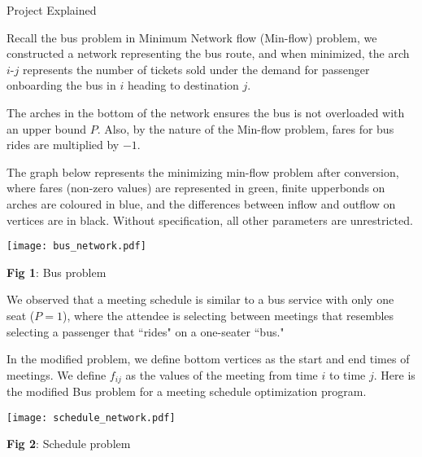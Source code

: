 \documentclass{article}
\begin{document}
\begin{center}
{\huge Project Explained
}
\end{center}
Recall the bus problem in Minimum Network flow (Min-flow) problem, we constructed a network representing the bus route, and when minimized, the arch $i$-$j$ represents the number of tickets sold under the demand for passenger onboarding the bus in $i$ heading to destination $j$.

The arches in the bottom of the network ensures the bus is not overloaded with an upper bound $P$. Also, by the nature of the Min-flow problem, fares for bus rides are multiplied by $-1$.

The graph below represents the minimizing min-flow problem after conversion, where fares (non-zero values) are represented in {\color{ForestGreen} green}, finite upperbonds on arches are coloured in  {\color{blue} blue}, and the differences between inflow and outflow on vertices are in black. Without specification, all other parameters are unrestricted.

\begin{center}
\texttt{[image: bus\_network.pdf]}

{\small \textbf{Fig 1}: Bus problem}
\end{center}

We observed that a meeting schedule is similar to a bus service with only one seat ($P=1$), where the attendee is selecting between meetings that resembles selecting a passenger that ``rides" on a one-seater ``bus."

In the modified problem, we define bottom vertices as the start and end times of meetings. We define $f_{ij}$ as the values of the meeting from time $i$ to time $j$. Here is the modified Bus problem for a meeting schedule optimization program.

\begin{center}
\texttt{[image: schedule\_network.pdf]}

{\small \textbf{Fig 2}: Schedule problem}
\end{center}
\end{document}
